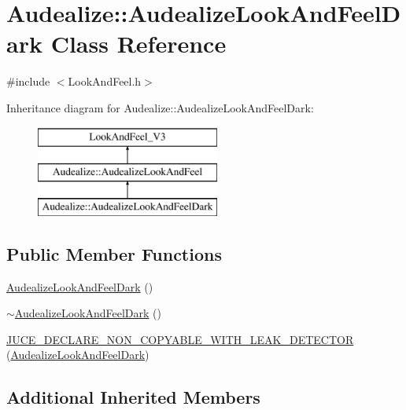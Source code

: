 \hypertarget{class_audealize_1_1_audealize_look_and_feel_dark}{}\section{Audealize\+:\+:Audealize\+Look\+And\+Feel\+Dark Class Reference}
\label{class_audealize_1_1_audealize_look_and_feel_dark}


{\ttfamily \#include $<$Look\+And\+Feel.\+h$>$}

Inheritance diagram for Audealize\+:\+:Audealize\+Look\+And\+Feel\+Dark\+:\begin{figure}[H]
\begin{center}
\leavevmode
\includegraphics[height=3.000000cm]{class_audealize_1_1_audealize_look_and_feel_dark}
\end{center}
\end{figure}
\subsection*{Public Member Functions}
\begin{DoxyCompactItemize}
\item 
\hyperlink{class_audealize_1_1_audealize_look_and_feel_dark_a2e8455f1559d436d138018adf98309a0}{Audealize\+Look\+And\+Feel\+Dark} ()
\item 
\hyperlink{class_audealize_1_1_audealize_look_and_feel_dark_add9751cc72a16847de562ca3d535fadb}{$\sim$\+Audealize\+Look\+And\+Feel\+Dark} ()
\item 
\hyperlink{class_audealize_1_1_audealize_look_and_feel_dark_aecafbaa94c26a85838c215b39920f081}{J\+U\+C\+E\+\_\+\+D\+E\+C\+L\+A\+R\+E\+\_\+\+N\+O\+N\+\_\+\+C\+O\+P\+Y\+A\+B\+L\+E\+\_\+\+W\+I\+T\+H\+\_\+\+L\+E\+A\+K\+\_\+\+D\+E\+T\+E\+C\+T\+OR} (\hyperlink{class_audealize_1_1_audealize_look_and_feel_dark}{Audealize\+Look\+And\+Feel\+Dark})
\end{DoxyCompactItemize}
\subsection*{Additional Inherited Members}


